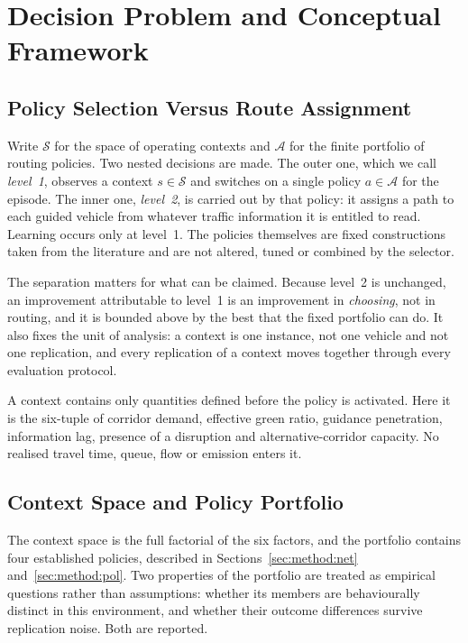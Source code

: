 
\section{Decision Problem and Conceptual Framework}
\label{sec:problem}

\subsection{Policy Selection Versus Route Assignment}
\label{sec:problem:levels}

Write $\mathcal{S}$ for the space of operating contexts and $\mathcal{A}$ for the
finite portfolio of routing policies. Two nested decisions are made. The outer
one, which we call \emph{level~1}, observes a context $s \in \mathcal{S}$ and
switches on a single policy $a \in \mathcal{A}$ for the episode. The inner one,
\emph{level~2}, is carried out by that policy: it assigns a path to each guided
vehicle from whatever traffic information it is entitled to read. Learning
occurs only at level~1. The policies themselves are fixed constructions taken
from the literature and are not altered, tuned or combined by the selector.

The separation matters for what can be claimed. Because level~2 is unchanged, an
improvement attributable to level~1 is an improvement in \emph{choosing}, not in
routing, and it is bounded above by the best that the fixed portfolio can do. It
also fixes the unit of analysis: a context is one instance, not one vehicle and
not one replication, and every replication of a context moves together through
every evaluation protocol.

A context contains only quantities defined before the policy is activated. Here
it is the six-tuple of corridor demand, effective green ratio, guidance
penetration, information lag, presence of a disruption and alternative-corridor
capacity. No realised travel time, queue, flow or emission enters it.

\subsection{Context Space and Policy Portfolio}
\label{sec:problem:space}

The context space is the full factorial of the six factors, and the portfolio
contains four established policies, described in Sections~\ref{sec:method:net}
and~\ref{sec:method:pol}. Two properties of the portfolio are treated as
empirical questions rather than assumptions: whether its members are
behaviourally distinct in this environment, and whether their outcome
differences survive replication noise. Both are reported.

